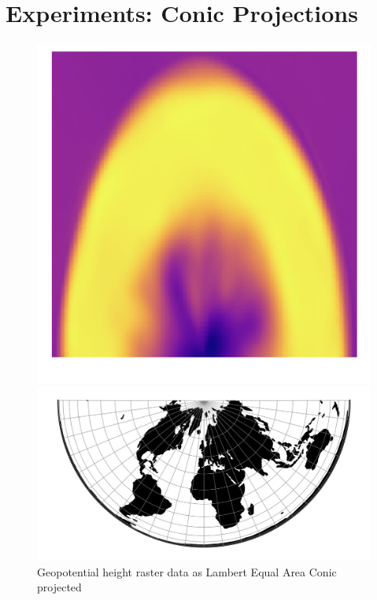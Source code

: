 \newpage
\section{Experiments: Conic Projections}
\begin{figure}[H]
    \centering
    \begin{minipage}{0.30\textwidth}
        \centering
        \includegraphics[width=0.9\linewidth]{figures/chapter-8/geopoth_leac.png}
        \caption{ Geopotential height raster data as Lambert Equal Area Conic projected}
        \label{fig:leac_geopoth_raster}
    \end{minipage}\hfill
    \begin{minipage}{0.30\textwidth}
        \centering
        \includegraphics[width=0.9\linewidth]{figures/chapter-8/leac.png}

\end{minipage}
\end{figure}
